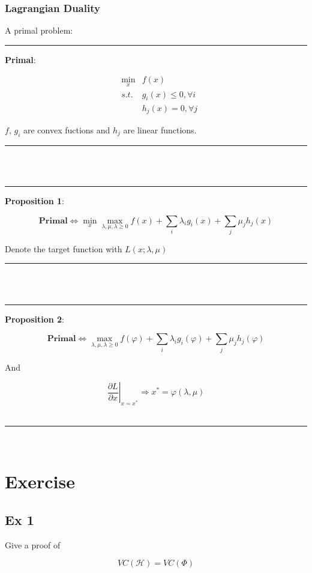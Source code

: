 \documentclass[UTF8]{article}
\begin{document}
\subsubsection{Lagrangian Duality}
A primal problem:\\
\rule{\textwidth}{0.5pt}\par
\textbf{Primal}:\par
\begin{eqnarray*}
 &\min_{x} &f(x) \\
&s.t. &g_{i}(x)\leq 0, \forall i\\
& &h_{j}(x)=0, \forall j
\end{eqnarray*}\par
$f$, $g_{i}$ are convex fuctions and $h_{j}$ are linear functions.\\
\rule{\textwidth}{0.5pt}\\
${}$\\
\rule{\textwidth}{0.5pt}\par
\textbf{Proposition 1}:\par
\begin{equation*}
\textbf{Primal}\Leftrightarrow
\min_{x}\max_{\lambda,\mu,\lambda\geq 0}f(x)+\sum_{i}\lambda_{i}g_{i}(x)+\sum_{j}\mu_{j}h_{j}(x)
\end{equation*}\par
Denote the target function with $L(x;\lambda,\mu)$\\
\rule{\textwidth}{0.5pt}\\
${}$\\
\rule{\textwidth}{0.5pt}\par
\textbf{Proposition 2}:\par
\begin{equation*}
\textbf{Primal}\Leftrightarrow
\max_{\lambda,\mu,\lambda\geq 0}f(\varphi)+\sum_{i}\lambda_{i}g_{i}(\varphi)+\sum_{j}\mu_{j}h_{j}(\varphi)
\end{equation*}\par
And\par
\begin{equation*}
\left.\frac{\partial L}{\partial x}\right|_{x=x^{*}}\Rightarrow x^{*}=\varphi(\lambda,\mu)
\end{equation*}\\
\rule{\textwidth}{0.5pt}\\
\section{Exercise}
\subsection{Ex 1}
Give a proof of\par
\begin{equation*}
VC(\mathcal{H})=VC(\Phi)
\end{equation*}
\end{document}
